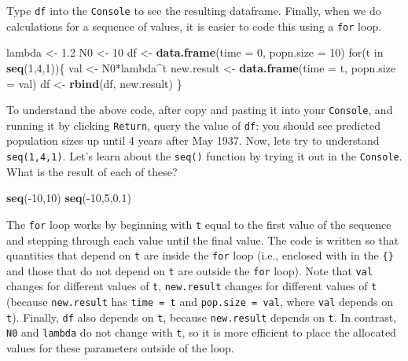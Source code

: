 \documentclass[]{book}
\newenvironment{Shaded}{\begin{snugshade}}{\end{snugshade}}
\newcommand{\KeywordTok}[1]{\textcolor[rgb]{0.13,0.29,0.53}{\textbf{{#1}}}}
\newcommand{\DataTypeTok}[1]{\textcolor[rgb]{0.13,0.29,0.53}{{#1}}}
\newcommand{\DecValTok}[1]{\textcolor[rgb]{0.00,0.00,0.81}{{#1}}}
\newcommand{\FloatTok}[1]{\textcolor[rgb]{0.00,0.00,0.81}{{#1}}}
\newcommand{\StringTok}[1]{\textcolor[rgb]{0.31,0.60,0.02}{{#1}}}
\newcommand{\NormalTok}[1]{{#1}}
\begin{document}
Type \texttt{df} into the \texttt{Console} to see the resulting
dataframe. Finally, when we do calculations for a sequence of values, it
is easier to code this using a \texttt{for} loop.

\begin{Shaded}
\begin{Highlighting}[]
\NormalTok{lambda <-}\StringTok{ }\FloatTok{1.2}
\NormalTok{N0 <-}\StringTok{ }\DecValTok{10}
\NormalTok{df <-}\StringTok{ }\KeywordTok{data.frame}\NormalTok{(}\DataTypeTok{time =} \DecValTok{0}\NormalTok{, }\DataTypeTok{popn.size =} \DecValTok{10}\NormalTok{)}
\NormalTok{for(t in }\KeywordTok{seq}\NormalTok{(}\DecValTok{1}\NormalTok{,}\DecValTok{4}\NormalTok{,}\DecValTok{1}\NormalTok{))\{}
  \NormalTok{val <-}\StringTok{ }\NormalTok{N0*lambda^t}
  \NormalTok{new.result <-}\StringTok{ }\KeywordTok{data.frame}\NormalTok{(}\DataTypeTok{time =} \NormalTok{t, }\DataTypeTok{popn.size =} \NormalTok{val)}
  \NormalTok{df <-}\StringTok{ }\KeywordTok{rbind}\NormalTok{(df, new.result)}
\NormalTok{\}}
\end{Highlighting}
\end{Shaded}

To understand the above code, after copy and pasting it into your
\texttt{Console}, and running it by clicking \texttt{Return}, query the
value of \texttt{df}: you should see predicted population sizes up until
4 years after May 1937. Now, lets try to understand \texttt{seq(1,4,1)}.
Let's learn about the \texttt{seq()} function by trying it out in the
\texttt{Console}. What is the result of each of these?

\begin{Shaded}
\begin{Highlighting}[]
\KeywordTok{seq}\NormalTok{(-}\DecValTok{10}\NormalTok{,}\DecValTok{10}\NormalTok{)}
\KeywordTok{seq}\NormalTok{(-}\DecValTok{10}\NormalTok{,}\DecValTok{5}\NormalTok{,}\FloatTok{0.1}\NormalTok{)}
\end{Highlighting}
\end{Shaded}

The \texttt{for} loop works by beginning with \texttt{t} equal to the
first value of the sequence and stepping through each value until the
final value. The code is written so that quantities that depend on
\texttt{t} are inside the \texttt{for} loop (i.e., enclosed with in the
\texttt{\{\}} and those that do not depend on \texttt{t} are outside the
\texttt{for} loop). Note that \texttt{val} changes for different values
of \texttt{t}, \texttt{new.result} changes for different values of
\texttt{t} (because \texttt{new.result} has \texttt{time\ =\ t} and
\texttt{pop.size\ =\ val}, where \texttt{val} depends on \texttt{t}).
Finally, \texttt{df} also depends on \texttt{t}, because
\texttt{new.result} depends on \texttt{t}. In contrast, \texttt{N0} and
\texttt{lambda} do not change with \texttt{t}, so it is more efficient
to place the allocated values for these parameters outside of the loop.
\end{document}
